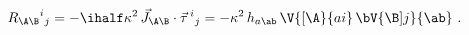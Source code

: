 \begin{equation}
  {R_{\A\B}}^i{}_j = - \ihalf \kappa^2\, \vec{J}_{\A\B} \cdot
  \vec{\tau}\,{}^i{}_j = - \kappa^2\, h_{a\ab}\, \V{[\A}{ai}\,
  \bV{\B]j}{\ab}\ .
 \end{equation}

